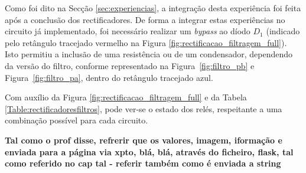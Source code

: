 Como foi dito na Secção \ref{sec:experiencias}, a integração desta experiência foi feita após a conclusão dos rectificadores. De forma a integrar estas experiências no circuito já implementado, foi necessário realizar um \textit{bypass} ao díodo $D_{1}$ (indicado pelo retângulo tracejado vermelho na Figura \ref{fig:rectificacao_filtragem_full}). Isto permitiu a inclusão de uma resistência ou de um condensador, dependendo da versão do filtro, conforme representado na Figura~\ref{fig:filtro_pb} e Figura~\ref{fig:filtro_pa}, dentro do retângulo tracejado azul.

Com auxílio da Figura \ref{fig:rectificacao_filtragem_full} e da Tabela \ref{Table:rectificadoresfiltros}, pode ver-se o estado dos relés, respeitante a uma combinação possível para cada circuito. 

\begin{table}[htb]
	\centering
	\caption{Exemplo funcionamento do rectificador de meia onda} 
	\label{Table:rectificadoresfiltros}
\end{table}

\textbf{Tal como o prof disse, refrerir que os valores, imagem, iformação e enviada para a página via xpto, blá, blá, através do ficheiro, flask, tal como referido no cap tal - referir também como é enviada a string}

